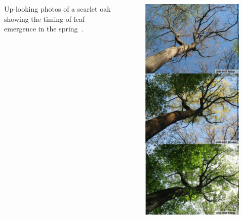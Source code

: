 \begin{frame}
\begin{columns}[c]
  \vskip0.1in
  \vbox{\scriptsize Up-looking photos of a scarlet oak showing the timing of leaf emergence in the spring~\citep{Hargrove_PERS_20091001}.}
  \begin{figure}
   \begin{center}
    \includegraphics[width=\textwidth]{figures/up-looking_photos}
   \end{center}
   \label{fig:up-looking_photos}
  \end{figure}
 \end{columns}
\end{frame}

